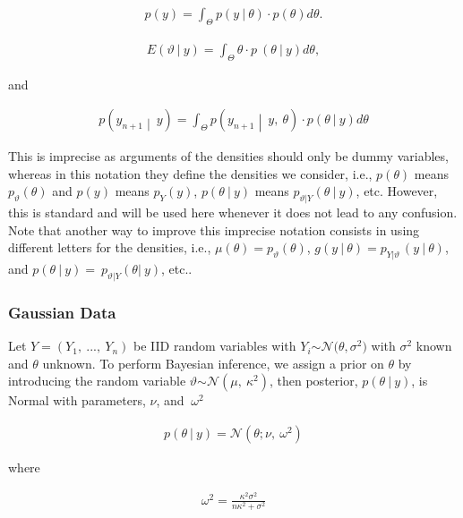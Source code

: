 \documentclass[11pt,a4paper]{article}
\begin{document}
\begin{align}p(y) = \int_{\Theta}^{}{p(y\ |\ \theta) \cdot p(\theta)}d\theta.\end{align}

\begin{align}E(\vartheta\ |\ y) = \int_{\Theta}^{}{\theta \cdot p\ (\theta\ |\ y)}d\theta,\end{align}

and

\begin{align}p\left( y_{n + 1} \middle| \ y \right) = \int_{\Theta}^{}{p\left( y_{n + 1} \middle| \ y,\ \theta \right) \cdot p(\theta\ |\ y)}d\theta\end{align}

This is imprecise as arguments of the densities should only be dummy
variables, whereas in this notation they deﬁne the densities we
consider, i.e., \(p(\theta)\) means \(p_{\vartheta}(\theta)\) and
\(p(y)\) means \(p_{Y}(y)\), \(p(\theta\ |\ y)\) means
\(p_{\vartheta|Y}(\theta\ |\ y)\), etc. However, this is standard and
will be used here whenever it does not lead to any confusion. Note that
another way to improve this imprecise notation consists in using
diﬀerent letters for the densities, i.e.,
\(\mu(\theta) = p_{\vartheta}(\theta)\),
\(g(y\ |\ \theta) = p_{Y|\vartheta\ }(y\ |\ \theta)\), and
\(p(\theta\ |\ y) = \ p_{\vartheta|Y}(\theta|\ y)\), etc..

\subsubsection{Gaussian Data}\label{gaussian-data}

Let \(Y = \left( Y_{1},\ ...,\ Y_{n} \right)\) be IID random variables
with \(Y_{i}\mathcal{\sim N(}\theta,\sigma^{2})\) with \(\sigma^{2}\)
known and \(\theta\) unknown. To perform Bayesian inference, we assign a
prior on \(\theta\) by introducing the random variable
\(\vartheta\mathcal{\sim N}(\mu,\ \kappa^{2})\), then posterior,
\(p(\theta\ |\ y)\), is Normal with parameters, \(\nu\), and
\(\ \omega^{2}\)

\begin{align}p(\theta\ |\ y) = \mathcal{N}\left( \theta;\nu,\ \omega^{2} \right)\end{align}

where

\begin{align}\omega^{2} = \frac{\kappa^{2}\sigma^{2}}{n\kappa^{2} + \sigma^{2}}\end{align}
\end{document}
